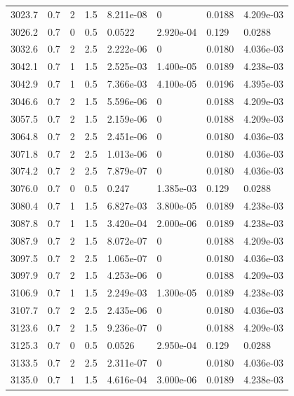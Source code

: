 \documentclass[preview]{standalone}
\begin{document}
{{{{{{{{{{{\begin{tabular}{L{1.2cm}C{1.2cm} C{0.3cm}C{0.5cm} C{1.4cm}C{1.4cm} C{1.4cm}C{1.4cm}}
  3023.7  &   0.7  & 2     & 1.5 &  8.211e-08  & 0  & 0.0188 &  4.209e-03   \\ 
  3026.2  &   0.7  & 0     & 0.5 &  0.0522  & 2.920e-04  & 0.129 &  0.0288   \\ 
  3032.6  &   0.7  & 2     & 2.5 &  2.222e-06  & 0  & 0.0180 &  4.036e-03   \\ 
  3042.1  &   0.7  & 1     & 1.5 &  2.525e-03  & 1.400e-05  & 0.0189 &  4.238e-03   \\ 
  3042.9  &   0.7  & 1     & 0.5 &  7.366e-03  & 4.100e-05  & 0.0196 &  4.395e-03   \\ 
  3046.6  &   0.7  & 2     & 1.5 &  5.596e-06  & 0  & 0.0188 &  4.209e-03   \\ 
  3057.5  &   0.7  & 2     & 1.5 &  2.159e-06  & 0  & 0.0188 &  4.209e-03   \\ 
  3064.8  &   0.7  & 2     & 2.5 &  2.451e-06  & 0  & 0.0180 &  4.036e-03   \\ 
  3071.8  &   0.7  & 2     & 2.5 &  1.013e-06  & 0  & 0.0180 &  4.036e-03   \\ 
  3074.2  &   0.7  & 2     & 2.5 &  7.879e-07  & 0  & 0.0180 &  4.036e-03   \\ 
  3076.0  &   0.7  & 0     & 0.5 &  0.247  & 1.385e-03  & 0.129 &  0.0288   \\ 
  3080.4  &   0.7  & 1     & 1.5 &  6.827e-03  & 3.800e-05  & 0.0189 &  4.238e-03   \\ 
  3087.8  &   0.7  & 1     & 1.5 &  3.420e-04  & 2.000e-06  & 0.0189 &  4.238e-03   \\ 
  3087.9  &   0.7  & 2     & 1.5 &  8.072e-07  & 0  & 0.0188 &  4.209e-03   \\ 
  3097.5  &   0.7  & 2     & 2.5 &  1.065e-07  & 0  & 0.0180 &  4.036e-03   \\ 
  3097.9  &   0.7  & 2     & 1.5 &  4.253e-06  & 0  & 0.0188 &  4.209e-03   \\ 
  3106.9  &   0.7  & 1     & 1.5 &  2.249e-03  & 1.300e-05  & 0.0189 &  4.238e-03   \\ 
  3107.7  &   0.7  & 2     & 2.5 &  2.435e-06  & 0  & 0.0180 &  4.036e-03   \\ 
  3123.6  &   0.7  & 2     & 1.5 &  9.236e-07  & 0  & 0.0188 &  4.209e-03   \\ 
  3125.3  &   0.7  & 0     & 0.5 &  0.0526  & 2.950e-04  & 0.129 &  0.0288   \\ 
  3133.5  &   0.7  & 2     & 2.5 &  2.311e-07  & 0  & 0.0180 &  4.036e-03   \\ 
  3135.0  &   0.7  & 1     & 1.5 &  4.616e-04  & 3.000e-06  & 0.0189 &  4.238e-03   \\ 

\end{tabular}}}}}}}}}}}}
\end{document}
